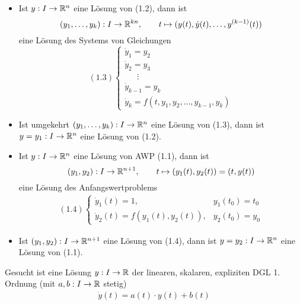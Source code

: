 \documentclass{cheat-sheet}
\begin{document}
\begin{satz}
  \begin{itemize}
    \item Ist $y : I \to \mathbb{R}^n$ eine Lösung von (1.2), dann ist
    \[
      (y_1, \ldots, y_k) : I \to \mathbb{R}^{kn},\qquad
      t \mapsto (y(t), \dot{y}(t), \ldots, y^{(k-1)}(t))
    \]
    eine Lösung des Systems von Gleichungen
    \[
      (1.3) \left\{ \begin{array}{ll}
      \dot{y}_1 = y_2\\
      \dot{y}_2 = y_3\\
      \quad\enspace\vdots\\
      \dot{y}_{k-1} = y_k\\
      \dot{y}_k = f(t, y_1, y_2, \ldots, y_{k-1}, y_k)
      \end{array} \right.
    \]
    \item Ist umgekehrt $(y_1, \ldots, y_k) : I \to \mathbb{R}^n$ eine Lösung von (1.3), dann ist $y = y_1 : I \to \mathbb{R}^n$ eine Lösung von (1.2).
  \end{itemize}
\end{satz}

\begin{satz}
  \begin{itemize}
    \item Ist $y : I \to \mathbb{R}^n$ eine Lösung von AWP (1.1), dann ist
    \[
      (y_1, y_2) : I \to \mathbb{R}^{n+1},\qquad
      t \mapsto (y_1(t), y_2(t)) = (t, y(t))
    \]
    eine Lösung des Anfangswertproblems
    \begin{align*}
      (1.4) \left\{ \begin{array}{ll}
        \dot{y}_1(t) = 1, & y_1(t_0) = t_0\\
        \dot{y}_2(t) = f(y_1(t), y_2(t)), & y_2(t_0) = y_0
      \end{array} \right.
    \end{align*}
    \item Ist $(y_1, y_2) : I \to \mathbb{R}^{n+1}$ eine Lösung von (1.4), dann ist $y = y_2 : I \to \mathbb{R}^n$ eine Lösung von (1.1).
  \end{itemize}
\end{satz}



\begin{prob}
  Gesucht ist eine Lösung $y : I \to \mathbb{R}$ der linearen, skalaren, expliziten DGL 1. Ordnung (mit $a, b : I \to \mathbb{R}$ stetig)
  \begin{align*}
    \dot{y}(t) = a(t) \cdot y(t) + b(t) \tag{1.5}
  \end{align*}
\end{prob}
\end{document}
